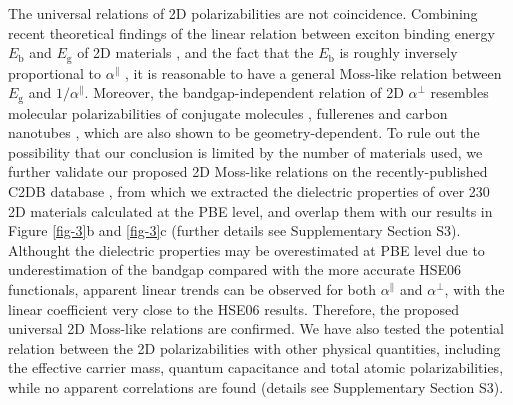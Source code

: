 \documentclass[journal=ancac3,manuscript=article,email=true,hyperref=true,keywords=false]{achemso}
\begin{document}
The universal relations of 2D polarizabilities are not
coincidence. Combining recent theoretical findings of the linear
relation between exciton binding energy $E_{\mathrm{b}}$ and
$E_{\mathrm{g}}$ of 2D materials
\cite{Choi_linear_2015,Olsen_2016_hydrogen,Jiang_2017_Eg_Eb}, and the
fact that the $E_{\mathrm{b}}$ is roughly inversely proportional to
$\alpha^{\parallel}$ \cite{Pulci_2014}, it is reasonable to have a
general Moss-like relation between $E_{\mathrm{g}}$ and
$1/\alpha^{\parallel}$. Moreover, the bandgap-independent relation of
2D $\alpha^{\perp}$ resembles molecular polarizabilities of conjugate
molecules \cite{Davies_1952}, fullerenes \cite{Sabirov_2014} and
carbon nanotubes \cite{Benedict_1995}, which are also shown to be
geometry-dependent. To rule out the possibility that our conclusion is
limited by the number of materials used, we further validate our
proposed 2D Moss-like relations on the recently-published C2DB
database \cite{Haastrup_2018}, from which we extracted the dielectric
properties of over 230 2D materials calculated at the PBE level, and
overlap them with our results in Figure \ref{fig-3}b and \ref{fig-3}c
(further details see Supplementary Section S3). Althought the
dielectric properties may be overestimated at PBE level due to
underestimation of the bandgap compared with the more accurate HSE06
functionals, apparent linear trends can be observed for both
$\alpha^{\parallel}$ and $\alpha^{\perp}$, with the linear coefficient
very close to the HSE06 results. Therefore, the proposed universal 2D
Moss-like relations are confirmed.  We have also tested the potential
relation between the 2D polarizabilities with other physical
quantities, including the effective carrier mass, quantum capacitance
and total atomic polarizabilities, while no apparent correlations are
found (details see Supplementary Section S3).
\end{document}
